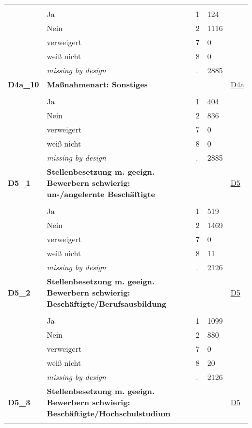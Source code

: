 \begin{longtable}{| L{2.65cm} | L{8cm} | C{1.5cm} | R{1.25cm} | C{2.25cm}  |}
   &  &  &  &  \\ 
   & Ja & 1 & 124 &  \\ 
   & Nein & 2 & 1116 &  \\ 
   & verweigert & 7 & 0 &  \\ 
   & weiß nicht & 8 & 0 &  \\ 
   & \textit{missing by design} & \textit{.} & 2885 &  \\ 
   \midrule
\textbf{D4a\_10}\label{var:D4a:10} & \textbf{Maßnahmenart: Sonstiges} &  &  & \hyperref[D4a]{D4a} \\ 
   &  &  &  &  \\ 
   & Ja & 1 & 404 &  \\ 
   & Nein & 2 & 836 &  \\ 
   & verweigert & 7 & 0 &  \\ 
   & weiß nicht & 8 & 0 &  \\ 
   & \textit{missing by design} & \textit{.} & 2885 &  \\ 
   \midrule
\textbf{D5\_1}\label{var:D5:1} & \textbf{Stellenbesetzung m. geeign. Bewerbern schwierig: un-/angelernte Beschäftigte} &  &  & \hyperref[D5]{D5} \\ 
   &  &  &  &  \\ 
   & Ja & 1 & 519 &  \\ 
   & Nein & 2 & 1469 &  \\ 
   & verweigert & 7 & 0 &  \\ 
   & weiß nicht & 8 & 11 &  \\ 
   & \textit{missing by design} & \textit{.} & 2126 &  \\ 
   \midrule
\textbf{D5\_2}\label{var:D5:2} & \textbf{Stellenbesetzung m. geeign. Bewerbern schwierig: Beschäftigte/Berufsausbildung} &  &  & \hyperref[D5]{D5} \\ 
   &  &  &  &  \\ 
   & Ja & 1 & 1099 &  \\ 
   & Nein & 2 & 880 &  \\ 
   & verweigert & 7 & 0 &  \\ 
   & weiß nicht & 8 & 20 &  \\ 
   & \textit{missing by design} & \textit{.} & 2126 &  \\ 
   \midrule
\textbf{D5\_3}\label{var:D5:3} & \textbf{Stellenbesetzung m. geeign. Bewerbern schwierig: Beschäftigte/Hochschulstudium} &  &  & \hyperref[D5]{D5} \\ 
   &  &  &  &  \\ 

\end{longtable}
